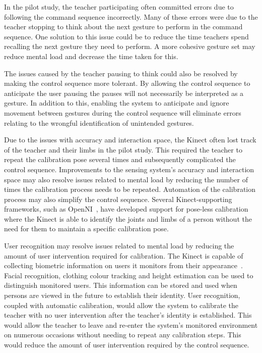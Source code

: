 \documentclass[link]{IWCOMP}
\begin{document}
In the pilot study, the teacher participating often committed errors due to following the command sequence incorrectly.
Many of these errors were due to the teacher stopping to think about the next gesture to perform in the command sequence.
One solution to this issue could be to reduce the time teachers spend recalling the next gesture they need to perform.
A more cohesive gesture set may reduce mental load and decrease the time taken for this.

The issues caused by the teacher pausing to think could also be resolved by making the control sequence more tolerant.
By allowing the control sequence to anticipate the user pausing the pauses will not necessarily be interpreted as a gesture.
In addition to this, enabling the system to anticipate and ignore movement between gestures during the control sequence will eliminate errors relating to the wrongful identification of unintended gestures.

Due to the issues with accuracy and interaction space, the Kinect often lost track of the teacher and their limbs in the pilot study.
This required the teacher to repeat the calibration pose several times and subsequently complicated the control sequence.
Improvements to the sensing system's accuracy and interaction space may also resolve issues related to mental load by reducing the number of times the calibration process needs to be repeated.
Automation of the calibration process may also simplify the control sequence.
Several Kinect-supporting frameworks, such as OpenNI~\citep{OpenNi2021}, have developed support for pose-less calibration where the Kinect is able to identify the joints and limbs of a person without the need for them to maintain a specific calibration pose.

User recognition may resolve issues related to mental load by reducing the amount of user intervention required for calibration.
The Kinect is capable of collecting biometric information on users it monitors from their appearance~\citep{Leyvand2011}.
Facial recognition, clothing colour tracking and height estimation can be used to distinguish monitored users.
This information can be stored and used when persons are viewed in the future to establish their identity.
User recognition, coupled with automatic calibration, would allow the system to calibrate the teacher with no user intervention after the teacher's identity is established.
This would allow the teacher to leave and re-enter the system's monitored environment on numerous occasions without needing to repeat any calibration steps.
This would reduce the amount of user intervention required by the control sequence.
\end{document}
